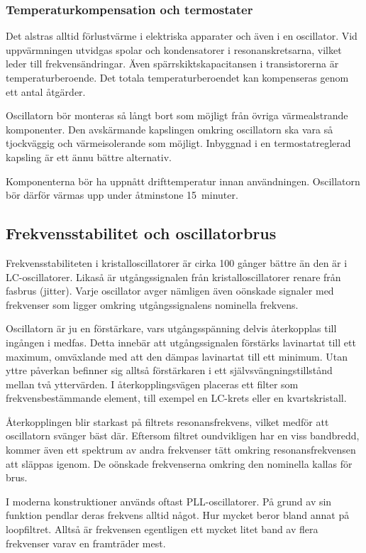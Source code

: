 \subsubsection{Temperaturkompensation och termostater}

Det alstras alltid förlustvärme i elektriska apparater och även i en oscillator.
Vid uppvärmningen utvidgas spolar och kondensatorer i resonanskretsarna,
vilket leder till frekvensändringar.
Även spärrskiktskapacitansen i transistorerna är temperaturberoende.
Det totala temperaturberoendet kan kompenseras genom ett antal åtgärder.

Oscillatorn bör monteras så långt bort som möjligt från övriga
värmealstrande komponenter.
Den avskärmande kapslingen omkring oscillatorn ska vara så tjockväggig och
värmeisolerande som möjligt.
Inbyggnad i en termostatreglerad kapsling är ett ännu bättre alternativ.

Komponenterna bör ha uppnått drifttemperatur innan användningen.
Oscillatorn bör därför värmas upp under åtminstone 15~minuter.

\subsection{Frekvensstabilitet och oscillatorbrus}

Frekvensstabiliteten i kristalloscillatorer är cirka 100 gånger bättre än
den är i LC-oscillatorer.
Likaså är utgångssignalen från kristalloscillatorer renare från fasbrus (jitter).
Varje oscillator avger nämligen även oönskade signaler med frekvenser som
ligger omkring utgångssignalens nominella frekvens.

Oscillatorn är ju en förstärkare, vars utgångsspänning delvis
återkopplas till ingången i medfas.
Detta innebär att utgångssignalen förstärks lavinartat till ett maximum,
omväxlande med att den dämpas lavinartat till ett minimum.
Utan yttre påverkan befinner sig alltså förstärkaren i ett
självsvängningstillstånd mellan två yttervärden.
I återkopplingsvägen placeras ett filter som frekvensbestämmande
element, till exempel en LC-krets eller en kvartskristall.

Återkopplingen blir starkast på filtrets resonansfrekvens, vilket
medför att oscillatorn svänger bäst där.
Eftersom filtret oundvikligen har en viss bandbredd, kommer även ett
spektrum av andra frekvenser tätt omkring resonansfrekvensen att släppas
igenom.
De oönskade frekvenserna omkring den nominella kallas för brus.

I moderna konstruktioner används oftast PLL-oscillatorer.
På grund av sin funktion pendlar deras frekvens alltid något.
Hur mycket beror bland annat på loopfiltret.
Alltså är frekvensen egentligen ett mycket litet band av flera frekvenser varav
en framträder mest.

